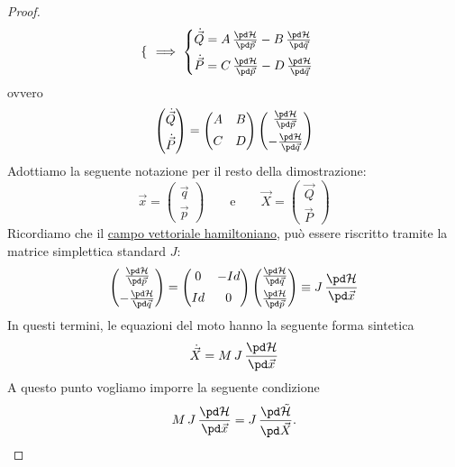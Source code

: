 \begin{proof}
\[\begin{cases}
		\end{cases}\implies
		\begin{cases}
			\dot{\vec{Q}} = A\,\frac{\pd\mathcal{H}}{\pd\vec{p}} - B\,\frac{\pd\mathcal{H}}{\pd\vec{q}} \\[0.5em]
			\dot{\vec{P}} = C\,\frac{\pd\mathcal{H}}{\pd\vec{p}} - D\,\frac{\pd\mathcal{H}}{\pd\vec{q}}
		\end{cases}
	\]
	ovvero
	\[
		\begin{pmatrix}\dot{\vec{Q}}\\[0.5em] \dot{\vec{P}}\end{pmatrix} = \begin{pmatrix}A & B\\[0.5em]C & D\end{pmatrix} \begin{pmatrix}
			\frac{\pd\mathcal{H}}{\pd\vec{p}} \\[0.5em]
			-\frac{\pd\mathcal{H}}{\pd\vec{q}}
		\end{pmatrix}
	\]
	Adottiamo la seguente notazione per il resto della dimostrazione:
	\[
		\vec{x} = \begin{pmatrix}\vec{q}\\[0.5em] \vec{p}\end{pmatrix} \qquad\text{e}\qquad \vec{X} = \begin{pmatrix}\vec{Q}\\[0.5em] \vec{P}\end{pmatrix}
	\]
	Ricordiamo che il \hyperref[df:campoVettorialeHamiltoniano]{campo vettoriale hamiltoniano}, può essere riscritto tramite la matrice simplettica standard \(J\):
	\[
		\begin{pmatrix}
			\frac{\pd\mathcal{H}}{\pd\vec{p}} \\[0.5em]
			-\frac{\pd\mathcal{H}}{\pd\vec{q}}
		\end{pmatrix} =
		\begin{pmatrix}
			0  & -Id \\[0.5em]
			Id & 0
		\end{pmatrix}
		\begin{pmatrix}
			\frac{\pd\mathcal{H}}{\pd\vec{q}} \\[0.5em]
			\frac{\pd\mathcal{H}}{\pd\vec{p}}
		\end{pmatrix} \equiv J\,\frac{\pd\mathcal{H}}{\pd\vec{x}}
	\]
	In questi termini, le equazioni del moto hanno la seguente forma sintetica
	\[
		\dot{\vec{X}} = M\,J\,\frac{\pd\mathcal{H}}{\pd\vec{x}}
	\]
	A questo punto vogliamo imporre la seguente condizione
	\[
		M\,J\,\frac{\pd\mathcal{H}}{\pd\vec{x}} = J\,\frac{\pd\tilde{\mathcal{H}}}{\pd\vec{X}}.
\]
\end{proof}
